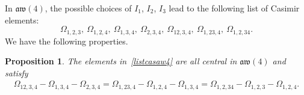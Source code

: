 \documentclass[pdftex]{sigma}
\numberwithin{equation}{section}
\newtheorem{prop}[theo]{Proposition}
\theoremstyle{definition}
\begin{document}
In $\mathfrak{aw}(4)$, the possible choices of $I_1$, $I_2$, $I_3$ lead to the following list of Casimir elements:
 \begin{equation}\label{listcasaw4}
 \varOmega_{1,2,3},\ \varOmega_{1,2,4},\ \varOmega_{1,3,4},\ \varOmega_{2,3,4},\ \varOmega_{12,3,4},\ \varOmega_{1,23,4},\ \varOmega_{1,2,34} .
 \end{equation}
We have the following properties.
\begin{prop}\label{propcas4}
 The elements in~\eqref{listcasaw4} are all central in $\mathfrak{aw}(4)$ and satisfy
\begin{eqnarray}\label{eq:cas4}
 \varOmega_{12,3,4}-\varOmega_{1,3,4}-\varOmega_{2,3,4}=\varOmega_{1,23,4}-\varOmega_{1,2,4}-\varOmega_{1,3,4}=\varOmega_{1,2,34}-\varOmega_{1,2,3}-\varOmega_{1,2,4} .
\end{eqnarray}
\end{prop}
\end{document}
